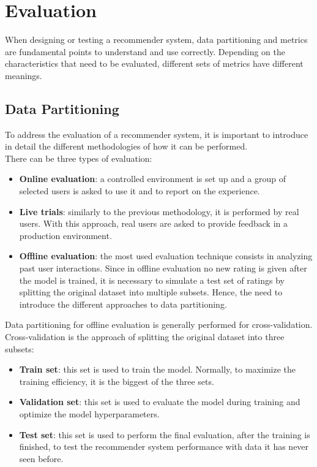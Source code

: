 \section{Evaluation}

When designing or testing a recommender system, data partitioning and metrics are fundamental points to understand and use correctly. Depending on the characteristics that need to be evaluated, different sets of metrics have different meanings.


\subsection{Data Partitioning}

To address the evaluation of a recommender system, it is important to introduce in detail the different methodologies of how it can be performed.\\
There can be three types of evaluation:
\begin{itemize}
\item \textbf{Online evaluation}: a controlled environment is set up and a group of selected users is asked to use it and to report on the experience.
\item \textbf{Live trials}: similarly to the previous methodology, it is performed by real users. With this approach, real users are asked to provide feedback in a production environment.
\item \textbf{Offline evaluation}: the most used evaluation technique consists in analyzing past user interactions. Since in offline evaluation no new rating is given after the model is trained, it is necessary to simulate a test set of ratings by splitting the original dataset into multiple subsets. Hence, the need to introduce the different approaches to data partitioning.
\end{itemize}\par
Data partitioning for offline evaluation is generally performed for cross-validation. Cross-validation is the approach of splitting the original dataset into three subsets:
\begin{itemize}
\item \textbf{Train set}: this set is used to train the model. Normally, to maximize the training efficiency, it is the biggest of the three sets.
\item \textbf{Validation set}: this set is used to evaluate the model during training and optimize the model hyperparameters.
\item \textbf{Test set}: this set is used to perform the final evaluation, after the training is finished, to test the recommender system performance with data it has never seen before.
\end{itemize}
